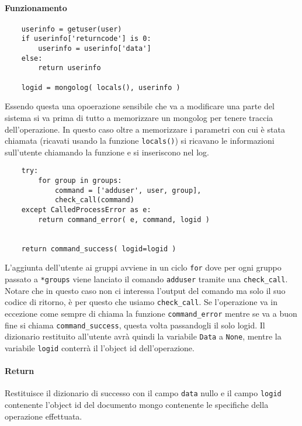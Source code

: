 \documentclass[11pt]{article}
\begin{document}
\paragraph{Funzionamento}
\begin{lstlisting}
    userinfo = getuser(user)
    if userinfo['returncode'] is 0:
        userinfo = userinfo['data']
    else:
        return userinfo

    logid = mongolog( locals(), userinfo )
\end{lstlisting}
Essendo questa una opoerazione sensibile che va a modificare una parte del sistema si va prima di tutto a memorizzare
un mongolog  per tenere traccia dell'operazione. In questo caso oltre a memorizzare i parametri con cui è stata
chiamata (ricavati usando la funzione \texttt{locals()}) si ricavano le informazioni sull'utente chiamando
la funzione  e si inseriscono nel log.
\begin{lstlisting}
    try:
    	for group in groups:
            command = ['adduser', user, group],
            check_call(command)
    except CalledProcessError as e:
        return command_error( e, command, logid )
    
    
    return command_success( logid=logid )
\end{lstlisting}
L'aggiunta dell'utente ai gruppi avviene in un ciclo \texttt{for} dove per ogni gruppo passato a \texttt{*groups}
viene lanciato il comando \texttt{adduser} tramite una \texttt{check\_call}. Notare che in questo caso non ci interessa
l'output del comando ma solo il suo codice di ritorno, è per questo che usiamo \texttt{check\_call}.
Se l'operazione va in eccezione come sempre di chiama la funzione \texttt{command\_error} mentre se va a buon fine
si chiama \texttt{command\_success}, questa volta passandogli il solo logid. Il dizionario restituito all'utente
avrà quindi la variabile \texttt{Data} a \texttt{None}, mentre la variabile \texttt{logid} conterrà il l'object id
dell'operazione.
\paragraph{Return}
Restituisce il dizionario di successo con il campo \texttt{data} nullo e il campo \texttt{logid} contenente l'object id
del documento mongo contenente le specifiche della operazione effettuata.
\end{document}
